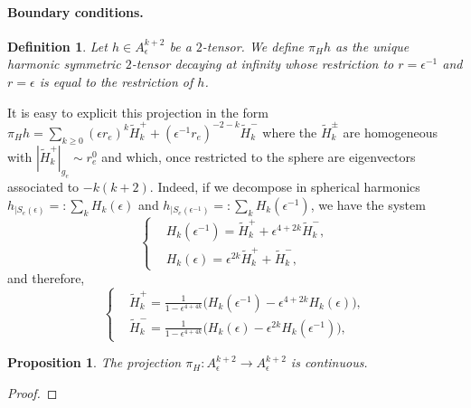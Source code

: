 \documentclass[12pt]{article}
\newtheorem{prop}[thm]{Proposition}
\newtheorem{defn}[thm]{Definition}
\begin{document}
    \paragraph{Boundary conditions.}
    \begin{defn}
        Let $h\in A^{k+2}_\epsilon$ be a $2$-tensor. We define
        $\pi_Hh$ as the unique harmonic symmetric $2$-tensor decaying at infinity whose restriction to $ r= \epsilon^{-1} $ and $r=\epsilon$ is equal to the restriction of $h$.
    \end{defn}
    
    It is easy to explicit this projection in the form $\pi_Hh = \sum_{k\geqslant 0}(\epsilon r_e)^k \tilde{H}_{k}^+    + (\epsilon^{-1} r_e)^{-2-k} \tilde{H}_{k}^-$ where the $\tilde{H}_{k}^\pm$ are homogeneous with $|\tilde{H}_{k}^+|_{g_e} \sim r_e^0$ and which, once restricted to the sphere are eigenvectors associated to $-k(k+2)$. Indeed, if we decompose in spherical harmonics $ h_{|S_e(\epsilon)} =: \sum_{k} H_{k}(\epsilon)$ and $ h_{|S_e(\epsilon^{-1})} =: \sum_{k} H_{k}(\epsilon^{-1})$, we have the system
    \begin{equation}
  \left\{
      \begin{aligned}
        &H_{k}(\epsilon^{-1}) = \tilde{H}_{k}^+ + \epsilon^{4+2k} \tilde{H}_{k}^-, \\
        &H_{k}(\epsilon) = \epsilon^{2k}\tilde{H}_{k}^+ + \tilde{H}_{k}^-,
      \end{aligned}
    \right.\label{dvp h}
\end{equation}
and therefore,
\begin{equation}
  \left\{
      \begin{aligned}
        &\tilde{H}_{k}^+ = \frac{1}{1-\epsilon^{4+4k}}\big(H_{k}(\epsilon^{-1}) -\epsilon^{4+2k}H_{k}(\epsilon) \big), \\
        &\tilde{H}_{k}^- = \frac{1}{1-\epsilon^{4+4k}}\big(H_{k}(\epsilon) - \epsilon^{2k} H_{k}(\epsilon^{-1})\big),
      \end{aligned}
    \right.\label{système}
\end{equation}
    
    
    \begin{prop}
        The projection $\pi_H: A^{k+2}_\epsilon\to A^{k+2}_\epsilon$ is continuous.
    \end{prop}
    \begin{proof}
    \end{proof}
    
\end{document}
